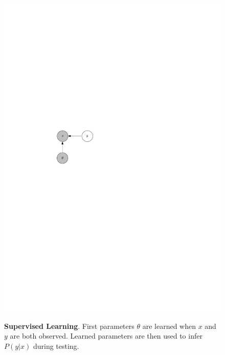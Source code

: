 \documentclass[12pt]{article}
\begin{document}
\begin{figure}
{    \includegraphics{supervised_test.pdf}
  }
  \caption{{\bf Supervised Learning}.  First parameters $\theta$ are learned when $x$ and $y$ are both observed.  Learned
  parameters are then used to infer $P(y|x)$ during testing.}
\end{figure}
\end{document}

